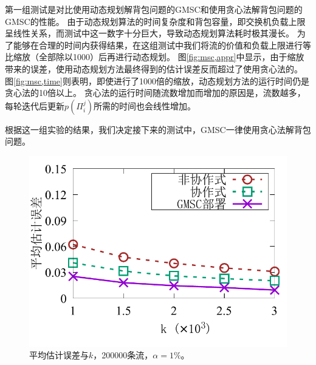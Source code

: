 第一组测试是对比使用动态规划解背包问题的GMSC和使用贪心法解背包问题的GMSC的性能。
由于动态规划算法的时间复杂度和背包容量，即交换机负载上限呈线性关系，而测试中这一数字十分巨大，导致动态规划算法耗时极其漫长。
为了能够在合理的时间内获得结果，在这组测试中我们将流的价值和负载上限进行等比缩放（全部除以1000）后再进行动态规划。
图\ref{fig:msc,appr}中显示，由于缩放带来的误差，使用动态规划方法最终得到的估计误差反而超过了使用贪心法的。
图\ref{fig:msc,time}则表明，即使进行了1000倍的缩放，动态规划方法的运行时间仍是贪心法的10倍以上。
贪心法的运行时间随流数增加而增加的原因是，流数越多，每轮迭代后更新$p(\Pi_i^j)$所需的时间也会线性增加。

根据这一组实验的结果，我们决定接下来的测试中，GMSC一律使用贪心法解背包问题。

\begin{figure}[ht]
	\centering
	\begin{minipage}[t]{0.48\linewidth}		
		\centering
		\includegraphics[width=\linewidth]{fig/msc_k_appr.pdf}
		\caption{\textnormal{平均估计误差与$k$，200000条流，$\alpha = 1\%$。}}
		\label{fig:msc,err,k}
	\end{minipage}\vspace{-0.6em}\hspace{0.4em}
	\begin{minipage}[t]{0.48\linewidth}
		\centering

\end{minipage}
\end{figure}
